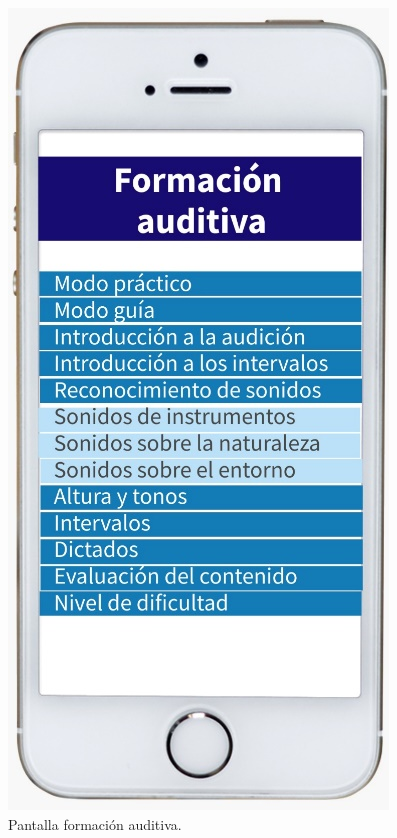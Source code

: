 \documentclass[spanish]{textolivre}
\begin{document}
\hfill
\begin{minipage}[b]{0.30\textwidth}
    \begin{figure}[H]
        \centering
        \includegraphics[width=\linewidth]{Fig8.png}
        \caption{Pantalla formación auditiva.}
    \end{figure}
\end{minipage}
\end{document}
